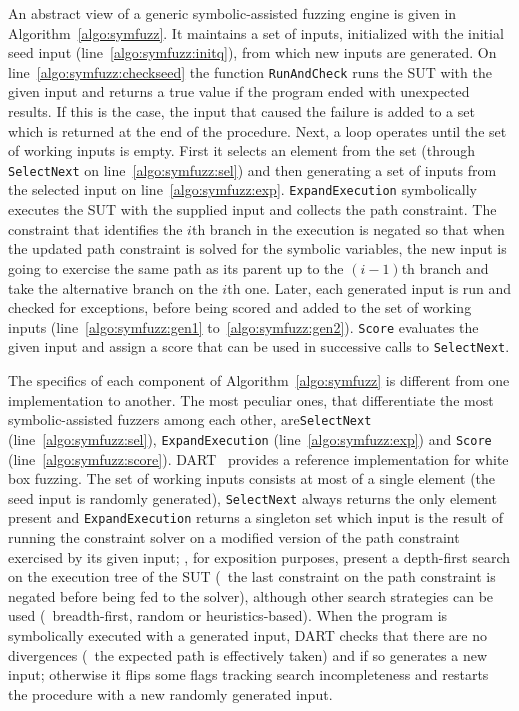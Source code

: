 An abstract view of a generic symbolic-assisted fuzzing engine is given in
Algorithm~\ref{algo:symfuzz}. It maintains a set of inputs, initialized with the
initial seed input (line~\ref{algo:symfuzz:initq}), from which new inputs are
generated. On line~\ref{algo:symfuzz:checkseed} the function
\texttt{RunAndCheck} runs the \ac{SUT} with the given input and returns a true
value if the program ended with unexpected results. If this is the case, the
input that caused the failure is added to a set which is returned at the end of
the procedure. Next, a loop operates until the set of working inputs is empty.
First it selects an element from the set (through \texttt{SelectNext} on
line~\ref{algo:symfuzz:sel}) and then generating a set of inputs from the
selected input on line~\ref{algo:symfuzz:exp}. \texttt{ExpandExecution}
symbolically executes the \ac{SUT} with the supplied input and collects the path
constraint. The constraint that identifies the $i$th branch in the execution is
negated so that when the updated path constraint is solved for the symbolic
variables, the new input is going to exercise the same path as its parent up to
the $(i-1)$th branch and take the alternative branch on the $i$th one. Later,
each generated input is run and checked for exceptions, before being scored and
added to the set of working inputs (line~\ref{algo:symfuzz:gen1}
to~\ref{algo:symfuzz:gen2}). \texttt{Score} evaluates the given input and assign
a score that can be used in successive calls to \texttt{SelectNext}.

The specifics of each component of Algorithm~\ref{algo:symfuzz} is different
from one implementation to another. The most peculiar ones, that differentiate
the most symbolic-assisted fuzzers among each other,
are\linebreak\texttt{SelectNext} (line~\ref{algo:symfuzz:sel}),
\texttt{ExpandExecution} (line~\ref{algo:symfuzz:exp}) and \texttt{Score}
(line~\ref{algo:symfuzz:score}). DART~\cite{Godefroid2005DARTDA} provides a
reference implementation for white box fuzzing. The set of working inputs
consists at most of a single element (the seed input is randomly generated),
\texttt{SelectNext} always returns the only element present and
\texttt{ExpandExecution} returns a singleton set which input is the result of
running the constraint solver on a modified version of the path constraint
exercised by its given input; \citeauthor{Godefroid2005DARTDA}, for exposition
purposes, present a depth-first search on the execution tree of the \ac{SUT}
(\ie~the last constraint on the path constraint is negated before being fed to
the solver), although other search strategies can be used (\eg~breadth-first,
random or heuristics-based). When the program is symbolically executed with a
generated input, DART checks that there are no divergences (\ie~the expected
path is effectively taken) and if so generates a new input; otherwise it flips
some flags tracking search incompleteness and restarts the procedure with a new
randomly generated input.

